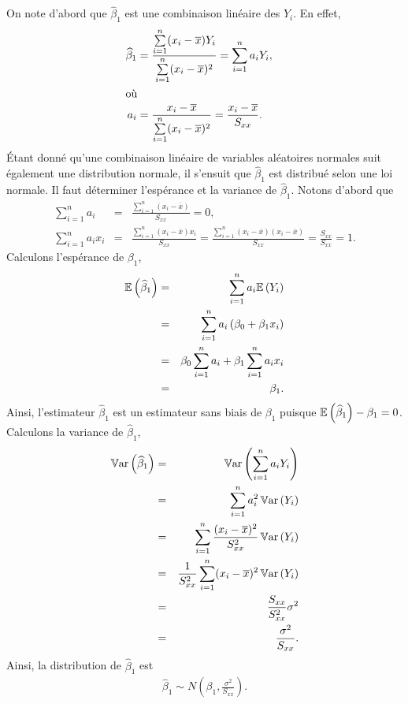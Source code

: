 On note d'abord que $\widehat{\beta}_1$ est une combinaison linéaire des $Y_i$. En effet,
\begin{align*} 
\widehat{\beta}_1 &= \frac{\sum\limits_{i=1}^n (x_i-\overline{x})Y_i}{\sum\limits_{i=1}^n (x_i-\overline{x})^2} = \sum_{i=1}^n a_i Y_i, \cr
\intertext{où}
a_i &= \frac{x_i-\overline{x}}{\sum\limits_{i=1}^n(x_i-\overline{x})^2} 
    =  \frac{x_i-\overline{x}}{S_{xx}}.
\end{align*}
Étant donné qu'une combinaison linéaire de variables aléatoires normales suit également une distribution normale, il s'ensuit que $\widehat\beta_1$ est distribué selon une loi normale. Il faut déterminer l'espérance et la variance de $\widehat\beta_1$. Notons d'abord que
 \begin{eqnarray*}
 \sum_{i=1}^n a_i & = & \frac{\sum\limits_{i=1}^n(x_i-\overline{x})} {S_{xx}} = 0, \\
\sum_{i=1}^n a_i x_i & = & \frac{\sum\limits_{i=1}^n(x_i-\overline{x})x_i } {S_{xx}} =\frac{\sum\limits_{i=1}^n(x_i-\overline{x})(x_i-\overline{x})}{S_{xx}}=\frac{S_{xx}}{S_{xx}}=1.
\end{eqnarray*}
Calculons l'espérance  de $\beta_1$,
\begin{eqnarray*}
 \mathbb{E}\left(\widehat{\beta}_1\right) &=& \sum_{i=1}^n a_i \mathbb{E}\left(Y_i\right)  \\
 &=& \sum_{i=1}^n a_i \left(\beta_0 + \beta_1 x_i\right)\\
 &=& \beta_0 \sum_{i=1}^n a_i + \beta_1 \sum_{i=1}^n a_i x_i\\
 &=& \beta_1.
\end{eqnarray*}
Ainsi, l'estimateur $\widehat{\beta}_1$ est un estimateur sans biais de $\beta_1$ puisque $\mathbb{E}\left(\widehat{\beta}_1\right)  - \beta_1 = 0$.
Calculons la variance de $\widehat\beta_1$, 
\begin{eqnarray*}
 \mathbb{V}\text{ar}\left(\widehat\beta_1\right)&=&\mathbb{V}\text{ar}\left(\sum_{i=1}^n a_i Y_i\right)\\
 &=& \sum_{i=1}^n a_i ^2 \, \mathbb{V}\text{ar}\left(Y_i\right)\\
 &=& \sum_{i=1}^n \frac{(x_i-\overline{x})^2}{S_{xx}^2}  \, \mathbb{V}\text{ar}\left(Y_i\right)\\
 &=& \frac{1}{S^2_{xx}} \sum_{i=1}^n (x_i-\overline{x})^2  \, \mathbb{V}\text{ar}\left(Y_i\right)\\
 &=& \frac{S_{xx}}{S_{xx}^2} \sigma^2 \\
 &=& \frac{\sigma^2}{S_{xx}}.
\end{eqnarray*}
Ainsi, la distribution de $\widehat\beta_1$ est
\begin{eqnarray}
\label{distbeta1}
 \widehat{\beta}_1 \sim N\left( \beta_1, \frac{\sigma^2}{S_{xx}} \right).
 \label{loibeta1}
\end{eqnarray}


